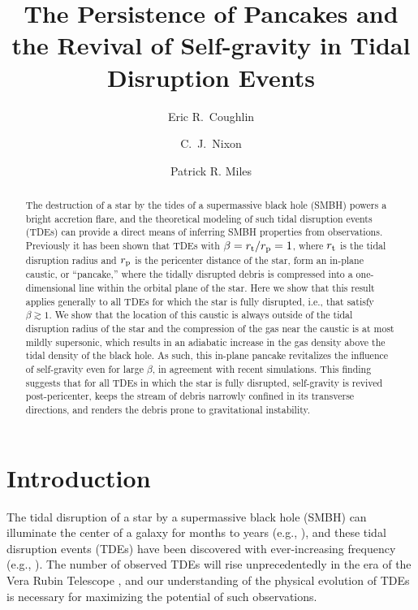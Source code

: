 \documentclass[twocolumn]{aastex62}
\begin{document}
\title{The Persistence of Pancakes and the Revival of Self-gravity in Tidal Disruption Events}

\author[0000-0003-3765-6401]{Eric R.~Coughlin}

\author[0000-0002-2137-4146]{C.~J.~Nixon}

\author[0000-0003-1354-1984]{Patrick R. Miles}

\begin{abstract}
The destruction of a star by the tides of a supermassive black hole (SMBH) powers a bright accretion flare, and the theoretical modeling of such tidal disruption events (TDEs) can provide a direct means of inferring SMBH properties from observations. Previously it has been shown that TDEs with $\beta = r_{\rm t}/r_{\rm p} = 1$, where $r_{\rm t}$ is the tidal disruption radius and $r_{\rm p}$ is the pericenter distance of the star, form an in-plane caustic, or ``pancake,'' where the tidally disrupted debris is compressed into a one-dimensional line within the orbital plane of the star. Here we show that this result applies generally to all TDEs for which the star is fully disrupted, i.e., that satisfy $\beta \gtrsim 1$. We show that the location of this caustic is always outside of the tidal disruption radius of the star and the compression of the gas near the caustic is at most mildly supersonic, which results in an adiabatic increase in the gas density above the tidal density of the black hole. As such, this in-plane pancake revitalizes the influence of self-gravity even for large $\beta$, in agreement with recent simulations. This finding suggests that for all TDEs in which the star is fully disrupted, self-gravity is revived post-pericenter, keeps the stream of debris narrowly confined in its transverse directions, and renders the debris prone to gravitational instability.
\end{abstract}



\section{Introduction}
The tidal disruption of a star by a supermassive black hole (SMBH) can illuminate the center of a galaxy for months to years (e.g., \citealt{rees88}), and these tidal disruption events (TDEs) have been discovered with ever-increasing frequency (e.g., \citealt{gezari12, hung17, holoien19, vanvelzen19, gomez20,holoien20}). The number of observed TDEs will rise unprecedentedly in the era of the Vera Rubin Telescope \citep{ivezic19}, and our understanding of the physical evolution of TDEs is necessary for maximizing the potential of such observations.
\end{document}
